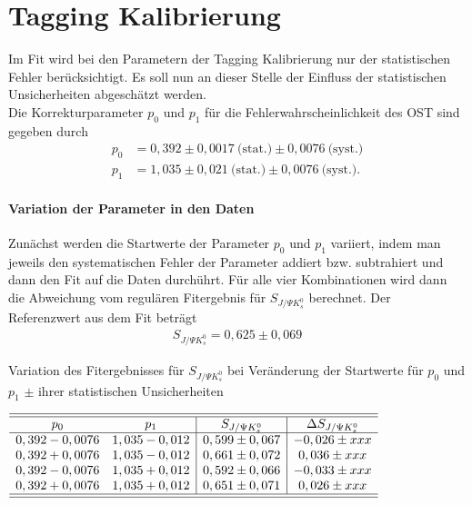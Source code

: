 \documentclass[a4paper]{scrbook}
\newcommand{\SJPsi}{S_{J/\Psi K_s^0}}
\begin{document}
\section{Tagging Kalibrierung}
Im Fit wird bei den Parametern der Tagging Kalibrierung nur der statistischen Fehler berücksichtigt. Es soll nun an dieser Stelle der Einfluss der statistischen Unsicherheiten abgeschätzt werden. \\
Die Korrekturparameter $p_0$ und $p_1$ für die Fehlerwahrscheinlichkeit des \gls{OST} sind gegeben durch
\begin{align}
p_0 &= 0,392 \pm 0,0017\ \text{(stat.)} \pm 0,0076\ \text{(syst.)} \\
p_1 &= 1,035 \pm 0,021\ \text{(stat.)} \pm 0,0076\ \text{(syst.)}.
\end{align}

\paragraph{Variation der Parameter in den Daten}
Zunächst werden die Startwerte der Parameter $p_0$ und $p_1$ variiert, indem man jeweils den systematischen Fehler der Parameter addiert bzw. subtrahiert und dann den Fit auf die Daten durchührt. Für alle vier Kombinationen wird dann die Abweichung vom regulären Fitergebnis für $\SJPsi$ berechnet. Der Referenzwert aus dem Fit beträgt
\begin{align}
\SJPsi = 0,625 \pm 0,069
\end{align}

\begin{table}[hptb]
\centering
\caption{Variation des Fitergebnisses für $\SJPsi$ bei Veränderung der Startwerte für $p_0$ und $p_1$ $\pm$ ihrer statistischen Unsicherheiten}
\label{tab:syst_fit_calib_data}
$\begin{array}{cc|c|c}
\hline\hline
p_0            & p_1           & \SJPsi          & \Delta\SJPsi   \\ \hline
0,392 - 0,0076 & 1,035 - 0,012 & 0,599 \pm 0,067 & -0,026 \pm xxx \\
0,392 + 0,0076 & 1,035 - 0,012 & 0,661 \pm 0,072 & 0,036 \pm xxx \\
0,392 - 0,0076 & 1,035 + 0,012 & 0,592 \pm 0,066 & -0,033 \pm xxx \\
0,392 + 0,0076 & 1,035 + 0,012 & 0,651 \pm 0,071 & 0,026 \pm xxx \\
\hline\hline
\end{array}$
\end{table}
\end{document}
